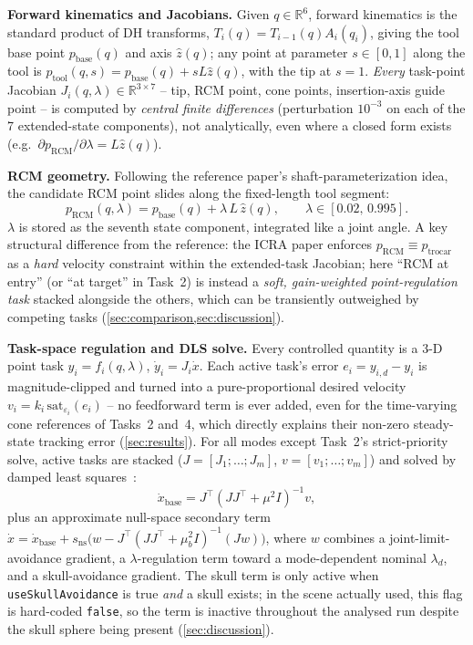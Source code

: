 \documentclass[11pt,a4paper]{article}
\newcommand{\code}[1]{\texttt{#1}}
\begin{document}
\textbf{Forward kinematics and Jacobians.} Given $q\in\mathbb{R}^6$, forward kinematics is the standard product of DH transforms, $T_i(q)=T_{i-1}(q)A_i(q_i)$, giving the tool base point $p_{\mathrm{base}}(q)$ and axis $\hat z(q)$; any point at parameter $s\in[0,1]$ along the tool is $p_{\mathrm{tool}}(q,s)=p_{\mathrm{base}}(q)+sL\hat z(q)$, with the tip at $s=1$. \emph{Every} task-point Jacobian $J_i(q,\lambda)\in\mathbb{R}^{3\times7}$ -- tip, RCM point, cone points, insertion-axis guide point -- is computed by \emph{central finite differences} (perturbation $10^{-3}$ on each of the 7 extended-state components), not analytically, even where a closed form exists (e.g.\ $\partial p_{\mathrm{RCM}}/\partial\lambda=L\hat z(q)$).

\textbf{RCM geometry.} Following the reference paper's shaft-parameterization idea, the candidate RCM point slides along the fixed-length tool segment:
\begin{equation}
p_{\mathrm{RCM}}(q,\lambda) = p_{\mathrm{base}}(q) + \lambda\,L\,\hat z(q), \qquad \lambda\in[0.02,\,0.995].
\label{eq:rcm}
\end{equation}
$\lambda$ is stored as the seventh state component, integrated like a joint angle. A key structural difference from the reference: the ICRA paper enforces $p_{\mathrm{RCM}}\equiv p_{\mathrm{trocar}}$ as a \emph{hard} velocity constraint within the extended-task Jacobian; here ``RCM at entry'' (or ``at target'' in Task~2) is instead a \emph{soft, gain-weighted point-regulation task} stacked alongside the others, which can be transiently outweighed by competing tasks (\cref{sec:comparison,sec:discussion}).

\textbf{Task-space regulation and DLS solve.} Every controlled quantity is a 3-D point task $y_i=f_i(q,\lambda)$, $\dot y_i=J_i\dot x$. Each active task's error $e_i=y_{i,d}-y_i$ is magnitude-clipped and turned into a pure-proportional desired velocity $v_i=k_i\,\mathrm{sat}_{\varepsilon_i}(e_i)$ -- no feedforward term is ever added, even for the time-varying cone references of Tasks~2 and~4, which directly explains their non-zero steady-state tracking error (\cref{sec:results}). For all modes except Task~2's strict-priority solve, active tasks are stacked ($J=[J_1;\dots;J_m]$, $v=[v_1;\dots;v_m]$) and solved by damped least squares~\cite{nakamura1986}:
\begin{equation}
\dot x_{\mathrm{base}} = J^{\!\top}\left(JJ^{\!\top}+\mu^2 I\right)^{-1} v,
\label{eq:dls}
\end{equation}
plus an approximate null-space secondary term $\dot x = \dot x_{\mathrm{base}} + s_{\mathrm{ns}}\big(w - J^{\!\top}(JJ^{\!\top}+\mu_b^2 I)^{-1}(Jw)\big)$, where $w$ combines a joint-limit-avoidance gradient, a $\lambda$-regulation term toward a mode-dependent nominal $\lambda_d$, and a skull-avoidance gradient. The skull term is only active when \code{useSkullAvoidance} is true \emph{and} a skull exists; in the scene actually used, this flag is hard-coded \code{false}, so the term is inactive throughout the analysed run despite the skull sphere being present (\cref{sec:discussion}).
\end{document}

